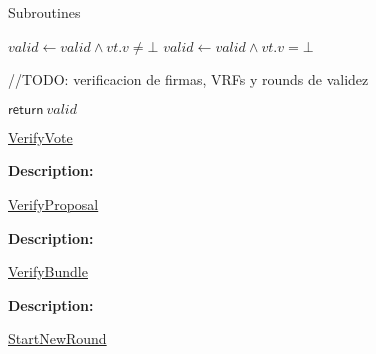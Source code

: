 \documentclass[10pt,a4paper]{article}
\begin{document}
\begin{section}{Subroutines}
\begin{algorithm}[H]
\begin{algorithmic}[1]
            \State $valid \gets valid \land vt.v \neq \bot$
            \State $valid \gets valid \land vt.v = \bot$
        \EndIf

        //TODO: verificacion de firmas, VRFs y rounds de validez

        \State $\mathsf{return} \ valid$
    \EndFunction
    \end{algorithmic}
    \caption{\underline{VerifyVote}}
\end{algorithm}

\noindent \textbf{Description:}\\


\begin{algorithm}[H]
    \begin{algorithmic}[1]

    \EndFunction
    \end{algorithmic}
    \caption{\underline{VerifyProposal}}
\end{algorithm}

\noindent \textbf{Description:}\\


\begin{algorithm}[H]
    \begin{algorithmic}[1]

    \EndFunction
    \end{algorithmic}
    \caption{\underline{VerifyBundle}}
\end{algorithm}

\noindent \textbf{Description:}\\


\begin{algorithm}[H]
    \begin{algorithmic}[1]

    \EndFunction
    \end{algorithmic}
    \caption{\underline{StartNewRound}}
\end{algorithm}


\end{section}
\end{document}
